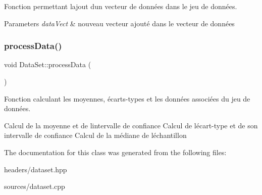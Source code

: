 Fonction permettant l\textquotesingle{}ajout d\textquotesingle{}un vecteur de données dans le jeu de données. 


\begin{DoxyParams}{Parameters}
{\em data\+Vect} & nouveau vecteur ajouté dans le vecteur de données \\
\hline
\end{DoxyParams}
\mbox{\label{classDataSet_a6e174dbffadb1a262c6cc92781d0bd12}} 
\subsubsection{\texorpdfstring{process\+Data()}{processData()}}
{\footnotesize\ttfamily void Data\+Set\+::process\+Data (\begin{DoxyParamCaption}{ }\end{DoxyParamCaption})}



Fonction calculant les moyennes, écarts-\/types et les données associées du jeu de données. 

Calcul de la moyenne et de l\textquotesingle{}intervalle de confiance Calcul de l\textquotesingle{}écart-\/type et de son intervalle de confiance Calcul de la médiane de l\textquotesingle{}échantillon 

The documentation for this class was generated from the following files\+:\begin{DoxyCompactItemize}
\item 
headers/dataset.\+hpp\item 
sources/dataset.\+cpp\end{DoxyCompactItemize}
